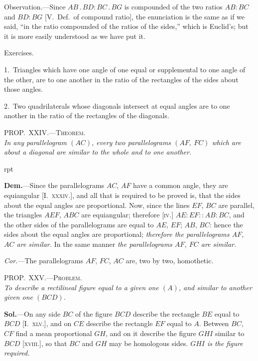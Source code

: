 \documentclass[oneside]{book}
\newcommand\myprop[2]{
\bigskip\Needspace*{4\baselineskip}\begin{center}\textsc{#1}\\\medskip\emph{#2}\par\end{center}
}
\newcommand\exhead[1]{
\Needspace*{5\baselineskip}\begin{center}
\textsf{#1}
\end{center}
}
\newcommand\imgflow[3]{
\setcounter{wrapwidth}{#1}
\begin{wrapfigure}[#2]{r}{\value{wrapwidth}pt}
\begin{center}
\vspace{-0.3in}
\end{center}
\end{wrapfigure}
}
\begin{document}
\begin{footnotesize}
\textsf{Observation.}---Since $AB\,.\,BD : BC\,.\,BG$ is compounded of the
two ratios $AB : BC$ and $BD : BG$ [V.\ Def.\ of compound ratio],
the enunciation is the same as if we said, ``in the ratio compounded
of the ratios of the sides,'' which is Euclid's; but it is
more easily understood as we have put it.
\par\end{footnotesize}

\exhead{Exercises.}

\begin{footnotesize}
1.~Triangles which have one angle of one equal or supplemental
to one angle of the other, are to one another in the ratio
of the rectangles of the sides about those angles.

2.~Two quadrilaterals whose diagonals intersect at equal
angles are to one another in the ratio of the rectangles of the
diagonals.

\par\end{footnotesize}


\myprop{PROP\@.~XXIV\@.---Theorem.}{In any parallelogram $(AC)$, every two parallelograms
$(AF,\ FC)$ which are about a diagonal are similar to the
whole and to one another.}

\imgflow{80}{8}{f204}

\textbf{Dem.}---Since the parallelograms $AC$, $AF$ have a
common angle, they are equiangular
[I.~\textsc{xxxiv.}], and all that is required to
be proved is, that the sides about the
equal angles are proportional. Now,
since the lines $EF$, $BC$ are parallel, the
triangles $AEF$, $ABC$ are equiangular;
therefore [\textsc{iv.}] $AE : EF :: AB : BC$,
and the other sides of the parallelograms
are equal to $AE$, $EF$; $AB$, $BC$: hence the sides
about the equal angles are proportional; \emph{therefore the
parallelograms $AF$, $AC$ are similar.} In the same manner
\emph{the parallelograms $AF$, $FC$ are similar.}

\emph{Cor.}---The parallelograms $AF$, $FC$, $AC$ are, two by
two, homothetic.

\myprop{PROP\@.~XXV\@.---Problem.}{To describe a rectilineal figure equal to a given one $(A)$,
and similar to another given one $(BCD)$.}

\textbf{Sol.}---On any side $BC$ of the figure $BCD$ describe the
rectangle $BE$ equal to $BCD$ [I.~\textsc{xlv.}], and on $CE$ describe
the rectangle $EF$ equal to $A$. Between $BC$, $CF$
find a mean proportional $GH$, and on it describe the
figure $GHI$ similar to $BCD$ [\textsc{xviii.}], so that $BC$ and
$GH$ may be homologous sides. \emph{$GHI$ is the figure required.}
\end{document}
